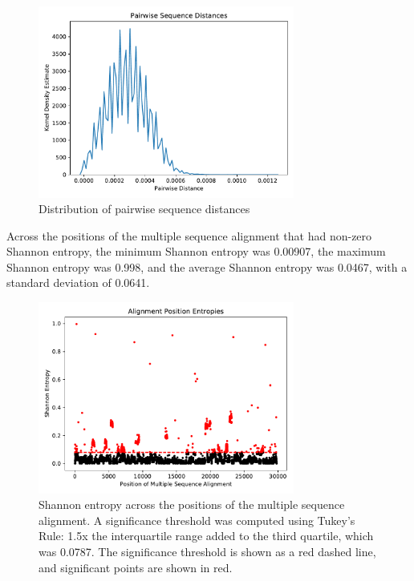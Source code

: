 \documentclass{article}
\begin{document}
\begin{figure}[h]
\centering
\includegraphics[width=0.75\textwidth,keepaspectratio]{./figs/pairwise_distances_sequences.pdf}
\caption{Distribution of pairwise sequence distances}
\end{figure}

 Across the positions of the multiple sequence alignment that had non-zero Shannon entropy, the minimum Shannon entropy was 0.00907, the maximum Shannon entropy was 0.998, and the average Shannon entropy was 0.0467, with a standard deviation of 0.0641.

\begin{figure}[h]
\centering
\includegraphics[width=0.75\textwidth,keepaspectratio]{./figs/alignment_entropies.pdf}
\caption{Shannon entropy across the positions of the multiple sequence alignment. A significance threshold was computed using Tukey's Rule: 1.5x the interquartile range added to the third quartile, which was 0.0787. The significance threshold is shown as a red dashed line, and significant points are shown in red.}
\end{figure}
\end{document}

